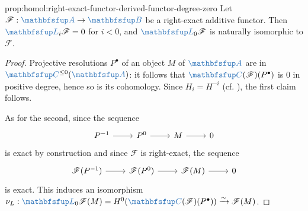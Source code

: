 \begin{prop}{}{prop:homol:right-exact-functor-derived-functor-degree-zero}
  Let $\mathscr{F} : \categ{A} \to \categ{B}$ be a right-exact
  additive functor. Then $\categ{L}_i\mathscr{F} = 0$ for $i < 0$, and
  $\categ{L}_0\mathscr{F}$ is naturally isomorphic to $\mathscr{F}$.
\end{prop}
\begin{proof}
  Projective resolutions $P^\bullet$ of an object $M$ of $\categ{A}$
  are in $\categ{C}^{\le 0}(\categ{A})$: it follows that
  $\categ{C}(\mathscr{F})(P^\bullet)$ is $0$ in positive degree, hence
  so is its cohomology. Since $H_i = H^{-i}$
  (cf. ),
  the first claim follows.

  As for the second, since the sequence
  \[\begin{tikzcd}
      P^{-1} \arrow[r] & P^0 \arrow[r] & M \arrow[r] & 0
    \end{tikzcd}\] is exact by construction and since $\mathscr{F}$ is
  right-exact, the sequence
  \[\begin{tikzcd}
      \mathscr{F}(P^{-1}) \arrow[r] & \mathscr{F}(P^0) \arrow[r] &
      \mathscr{F}(M) \arrow[r] & 0
    \end{tikzcd}\] is exact. This induces an isomorphism
  $\nu_L : \categ{L}_0\mathscr{F}(M) =
  H^0(\categ{C}(\mathscr{F})(P^\bullet)) \xrightarrow{\sim}
  \mathscr{F}(M)$.


\end{proof}

